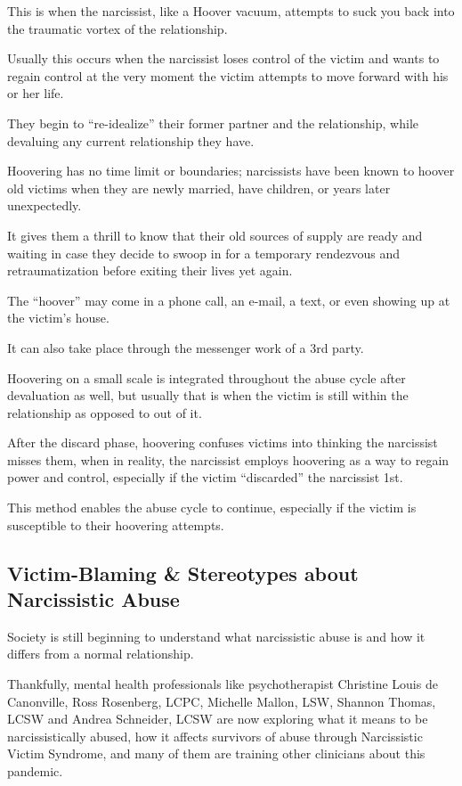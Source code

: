 \documentclass[oneside]{book}
\numberwithin{equation}{section}
\begin{document}
This is when the narcissist, like a Hoover vacuum, attempts to suck you back into the traumatic vortex of the relationship.

Usually this occurs when the narcissist loses control of the victim and wants to regain control at the very moment the victim attempts to move forward with his or her life.

They begin to ``re-idealize'' their former partner and the relationship, while devaluing any current relationship they have.

%
Hoovering has no time limit or boundaries; narcissists have been known to hoover old victims when they are newly married, have children, or years later unexpectedly.

It gives them a thrill to know that their old sources of supply are ready and waiting in case they decide to swoop in for a temporary rendezvous and retraumatization before exiting their lives yet again.

%
The ``hoover'' may come in a phone call, an e-mail, a text, or even showing up at the victim's house.

It can also take place through the messenger work of a 3rd party.

Hoovering on a small scale is integrated throughout the abuse cycle after devaluation as well, but usually that is when the victim is still within the relationship as opposed to out of it.

After the discard phase, hoovering confuses victims into thinking the narcissist misses them, when in reality, the narcissist employs hoovering as a way to regain power and control, especially if the victim ``discarded'' the narcissist 1st.

This method enables the abuse cycle to continue, especially if the victim is susceptible to their hoovering attempts.

\subsection{Victim-Blaming \& Stereotypes about Narcissistic Abuse}
Society is still beginning to understand what narcissistic abuse is and how it differs from a normal relationship.

Thankfully, mental health professionals like psychotherapist Christine Louis de Canonville, Ross Rosenberg, LCPC, Michelle Mallon, LSW, Shannon Thomas, LCSW and Andrea Schneider, LCSW are now exploring what it means to be narcissistically abused, how it affects survivors of abuse through Narcissistic Victim Syndrome, and many of them are training other clinicians about this pandemic.
\end{document}
